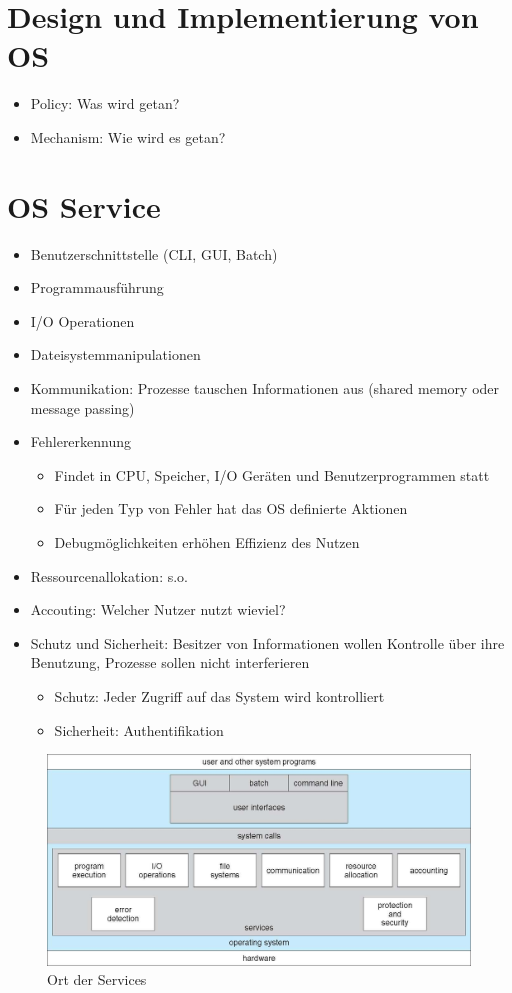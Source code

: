 \documentclass[a4paper]{scrreprt}
\begin{document}
\section{Design und Implementierung von OS}
\begin{itemize}
	\item Policy: Was wird getan?
	\item Mechanism: Wie wird es getan?
\end{itemize}

\section{OS Service}
\begin{itemize}
	\item Benutzerschnittstelle (CLI, GUI, Batch)
	\item Programmausführung
	\item I/O Operationen
	\item Dateisystemmanipulationen
	\item Kommunikation: Prozesse tauschen Informationen aus (shared memory oder message passing)
	\item Fehlererkennung
		\begin{itemize}
			\item Findet in CPU, Speicher, I/O Geräten und Benutzerprogrammen statt
			\item Für jeden Typ von Fehler hat das OS definierte Aktionen
			\item Debugmöglichkeiten erhöhen Effizienz des Nutzen
		\end{itemize}
	\item Ressourcenallokation: s.o.
	\item Accouting: Welcher Nutzer nutzt wieviel?
	\item Schutz und Sicherheit: Besitzer von Informationen wollen Kontrolle über ihre Benutzung, Prozesse sollen nicht interferieren
		\begin{itemize}
			\item Schutz: Jeder Zugriff auf das System wird kontrolliert
			\item Sicherheit: Authentifikation
		\end{itemize}
\end{itemize}

\begin{figure}[ht]
\centering
\includegraphics[scale=0.35]{graphics/services.png}
\caption{Ort der Services}
\end{figure}
\end{document}
